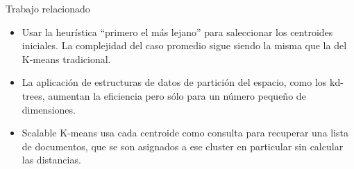 \begin{frame}{Trabajo relacionado}

\begin{itemize}
\item Usar la heurística ``primero el más lejano'' para saleccionar
los centroides iniciales. La complejidad del caso promedio 
sigue siendo la misma que la del K-means tradicional.

\item La aplicación de estructuras de datos de partición del espacio,
como los kd-trees, aumentan la eficiencia pero sólo para
un número pequeño de dimensiones.

\item Scalable K-means usa cada centroide como consulta para recuperar
una lista de documentos, que se son asignados a ese cluster en particular 
sin calcular las distancias. 

\end{itemize}

\end{frame}